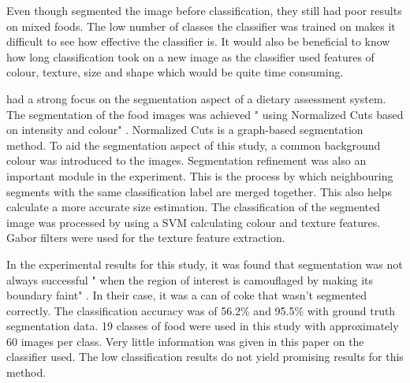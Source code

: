 Even though \parencite{pouladzadeh2014measuring} segmented the image before classification, they still had poor results on mixed foods.
The low number of classes the classifier was trained on makes it difficult to see how effective the classifier is.
It would also be beneficial to know how long classification took on a new image as the classifier used features of colour, texture, size and shape which would be quite time consuming.

\parencite{zhu2011segmentation} had a strong focus on the segmentation aspect of a dietary assessment system.
The segmentation of the food images was achieved " using Normalized Cuts based on intensity and colour" \parencite{zhu2011segmentation}.
Normalized Cuts is a graph-based segmentation method.
To aid the segmentation aspect of this study, a common background colour was introduced to the images.
Segmentation refinement was also an important module in the experiment.
This is the process by which neighbouring segments with  the same classification label are merged together.
This also helps calculate a more accurate size estimation.
The classification of the segmented image was processed by using a SVM calculating colour and texture features.
Gabor filters were used for the texture feature extraction.

In the experimental results for this study, it was found that segmentation was not always successful " when the region of interest is camouflaged by making its boundary faint" \parencite{zhu2011segmentation}. In their case, it was a can of coke that wasn't segmented correctly.
The classification accuracy was of 56.2\% and 95.5\% with ground truth segmentation data.
19 classes of food were used in this study with approximately 60 images per class.
Very little information was given in this paper on the classifier used.
The low classification results do not yield promising results for this method.



